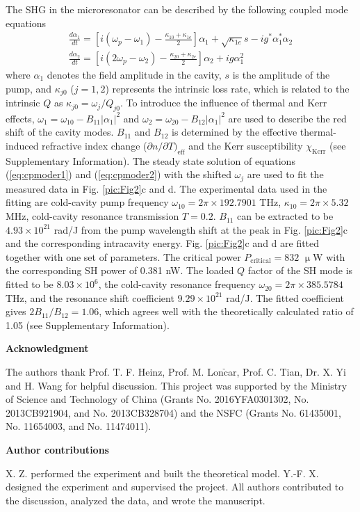 \documentclass[a4paper,8pt,hyperref, twocolumn, aps, prl]{article}
\begin{document}
\noindent The SHG in the microresonator can be described by the following coupled mode equations
\begin{gather}
\label{eq:cpmoder1}
\frac{d{\alpha}_1}{dt} = [i(\omega_p-\omega_1)-\frac{\kappa_{10}+\kappa_{1e}}{2}]{\alpha}_1+\sqrt{\kappa_{1e}}s-ig^*{\alpha}_1^*{\alpha}_2 \\
\frac{d{\alpha}_2}{dt} = [i(2\omega_p-\omega_2)-\frac{\kappa_{20}+\kappa_{2e}}{2}]{\alpha}_2+ig{\alpha}_1^2
\label{eq:cpmoder2}
\end{gather}
where ${\alpha}_1$ denotes the field amplitude in the cavity, $s$ is the amplitude of the pump, and $\kappa_{j0}$ ($j = 1,2$) represents the intrinsic loss rate, which is related to the intrinsic $Q$ as $\kappa_{j0} = \omega_{j}/Q_{j0}$.
To introduce the influence of thermal and Kerr effects, $\omega_1 =\omega_{10} -B_{11}|\alpha_1|^2$ and $\omega_2 =\omega_{20} -B_{12}|\alpha_1|^2$ are used to describe the red shift of the cavity modes.
$B_{11}$ and $B_{12}$ is determined by the effective thermal-induced refractive index change (${\partial n}/{\partial T})_{\mathrm{eff}}$ and the Kerr susceptibility $\chi_{\mathrm{Kerr}}$ (see Supplementary Information).
The steady state solution of equations (\ref{eq:cpmoder1}) and (\ref{eq:cpmoder2}) with the shifted $\omega_j$ are used to fit the measured data in Fig. \ref{pic:Fig2}c and d. 
The experimental data used in the fitting are cold-cavity pump frequency $\omega_{10} = 2\pi \times 192.7901$ THz, $\kappa_{10} = 2\pi \times 5.32$ MHz, cold-cavity resonance transmission $T = 0.2$. $B_{11}$ can be extracted to be $4.93 \times 10^{21}$ rad/J from the pump wavelength shift at the peak in Fig. \ref{pic:Fig2}c and the corresponding intracavity energy. Fig. \ref{pic:Fig2}c and d are fitted together with one set of parameters. The critical power $P_{\mathrm{critical}} = 832$ $\upmu$W with the corresponding SH power of 0.381 nW. The loaded $Q$ factor of the SH mode is fitted to be $8.03 \times 10^6$, the cold-cavity resonance frequency $\omega_{20} = 2\pi \times 385.5784$ THz, and the resonance shift coefficient $9.29 \times 10^{21}$ rad/J. The fitted coefficient gives $2B_{11}/B_{12}=1.06$, which agrees well with the theoretically calculated ratio of 1.05 (see Supplementary Information). 



\bigskip
\noindent \textbf{\large Acknowledgment}

\noindent The authors thank Prof. T. F. Heinz, Prof. M. Lon$\mathrm{\check{c}}$ar, Prof. C. Tian, Dr. X. Yi and H. Wang for helpful discussion.
This project was supported by the Ministry of Science
and Technology of China (Grants No. 2016YFA0301302,
No. 2013CB921904, and No. 2013CB328704) and the NSFC
(Grants No. 61435001, No. 11654003, and No. 11474011).

\bigskip
\noindent \textbf{\large Author contributions}

\noindent X. Z. performed the experiment and built the theoretical model. Y.-F. X. designed the
experiment and supervised the project. All authors contributed
to the discussion, analyzed the data, and wrote the
manuscript.
\end{document}
